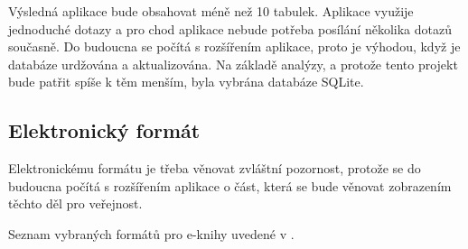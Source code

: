         Výsledná aplikace bude obsahovat méně než 10 tabulek. Aplikace využije jednoduché dotazy a pro chod aplikace nebude potřeba posílání několika dotazů současně. Do budoucna se počítá s rozšířením aplikace, proto je výhodou, když je databáze urdžována a aktualizována. Na základě analýzy, a protože tento projekt bude patřit spíše k těm menším, byla vybrána databáze SQLite.
        
        \subsection{Elektronický formát}
            \cite{electronic-format}
            
            Elektronickému formátu je třeba věnovat zvláštní pozornost, protože se do budoucna počítá s rozšířením aplikace o část, která se bude věnovat zobrazením těchto děl pro veřejnost.
            
            Seznam vybraných formátů pro e-knihy uvedené v \cite{electronic-format}.
            

